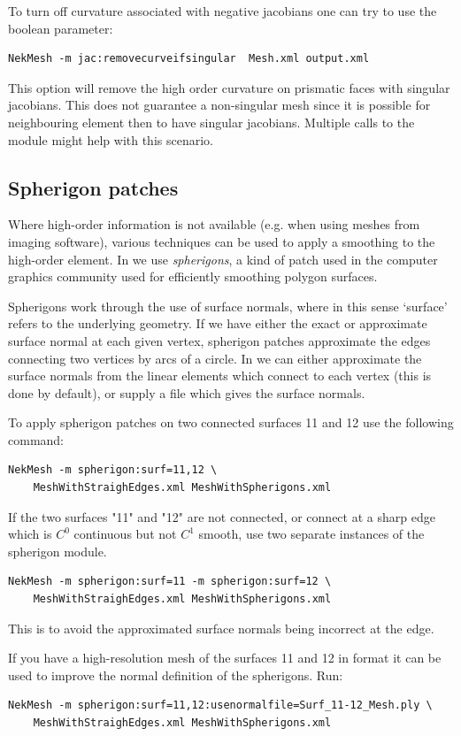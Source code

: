 To turn off curvature associated with negative jacobians one can try to use the  boolean parameter:
\begin{lstlisting}[style=BashInputStyle]
NekMesh -m jac:removecurveifsingular  Mesh.xml output.xml
\end{lstlisting}
This option will remove the high order curvature on prismatic faces
with singular jacobians. This does not guarantee a non-singular mesh
since it is possible for neighbouring element then to have singular
jacobians. Multiple calls to the module might help with this scenario.

\subsection{Spherigon patches}

Where high-order information is not available (e.g. when using meshes from
imaging software), various techniques can be used to apply a smoothing to the
high-order element. In \mc we use \emph{spherigons}, a kind of patch used in the
computer graphics community used for efficiently smoothing polygon surfaces.

Spherigons work through the use of surface normals, where in this sense
`surface' refers to the underlying geometry. If we have either the exact or
approximate surface normal at each given vertex, spherigon patches approximate
the edges connecting two vertices by arcs of a circle. In \mc we can either
approximate the surface normals from the linear elements which connect to each
vertex (this is done by default), or supply a file which gives the surface
normals.

To apply spherigon patches on two connected surfaces 11 and 12 use the following
command:
%
\begin{lstlisting}[style=BashInputStyle]
NekMesh -m spherigon:surf=11,12 \
    MeshWithStraighEdges.xml MeshWithSpherigons.xml
\end{lstlisting}
%
If the two surfaces "11" and "12" are not connected, or connect at a sharp edge
which is $C^0$ continuous but not $C^1$ smooth, use two separate instances of
the spherigon module.
%
\begin{lstlisting}[style=BashInputStyle]
NekMesh -m spherigon:surf=11 -m spherigon:surf=12 \
    MeshWithStraighEdges.xml MeshWithSpherigons.xml
\end{lstlisting}
%
This is to avoid the approximated surface normals being incorrect at the edge.

If you have a high-resolution mesh of the surfaces 11 and 12 in \inltt{ply}
format it can be used to improve the normal definition of the spherigons. Run:
\begin{lstlisting}[style=BashInputStyle]
NekMesh -m spherigon:surf=11,12:usenormalfile=Surf_11-12_Mesh.ply \
    MeshWithStraighEdges.xml MeshWithSpherigons.xml
\end{lstlisting}


